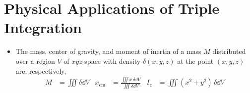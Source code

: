 \documentclass[../main.tex]{subfiles}
\begin{document}
\section{Physical Applications of Triple Integration}
\begin{itemize}
    \item The mass, center of gravity, and moment of inertia of a mass $M$ distributed over a region $V$ of $xyz$-space with density $\delta(x,y,z)$ at the point $(x,y,z)$ are, respectively,
    \begin{align*}
        M &= \iiint\delta\dd{V}&
            x_\text{cm} &= \frac{\iiint x\, \delta\dd{V}}{\iiint\delta\dd{V}}&
                I_z &= \iiint(x^2+y^2)\, \delta\dd{V}
    \end{align*}
\end{itemize}
\end{document}
